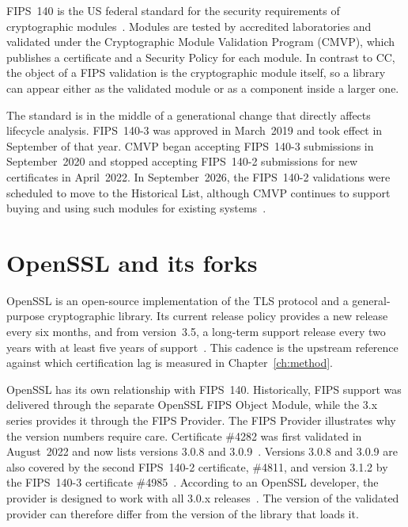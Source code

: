 FIPS~140 is the US federal standard for the security requirements of
cryptographic modules~\cite{fips1402,fips1403}. Modules are tested by
accredited laboratories and validated under the Cryptographic Module
Validation Program (CMVP), which publishes a certificate and a Security
Policy for each module. In contrast to CC, the object of a FIPS validation
is the cryptographic module itself, so a library can appear either as the
validated module or as a component inside a larger one.

The standard is in the middle of a generational change that directly affects
lifecycle analysis. FIPS~140-3 was approved in March~2019 and took effect in
September of that year. CMVP began accepting FIPS~140-3 submissions in
September~2020 and stopped accepting FIPS~140-2 submissions for new
certificates in April~2022. In September~2026, the FIPS~140-2 validations were
scheduled to move to the Historical List, although CMVP continues to support
buying and using such modules for existing systems~\cite{nistTransition}.


\section{OpenSSL and its forks}
\label{sec:libraries}

OpenSSL is an open-source implementation of the TLS protocol and a
general-purpose cryptographic library. Its current release policy provides a
new release every six months, and from version~3.5, a long-term support
release every two years with at least five years of
support~\cite{opensslReleaseStrategy}. This cadence is the upstream reference
against which certification lag is measured in Chapter~\ref{ch:method}.

OpenSSL has its own relationship with FIPS~140. Historically, FIPS support was
delivered through the separate OpenSSL FIPS Object Module, while the 3.x series
provides it through the FIPS Provider. The FIPS Provider illustrates why the
version numbers require care. Certificate \#4282 was first validated in
August~2022 and now lists versions 3.0.8 and 3.0.9~\cite{cmvp4282}. Versions
3.0.8 and 3.0.9 are also covered by the second FIPS~140-2 certificate, \#4811,
and version 3.1.2 by the FIPS~140-3 certificate \#4985~\cite{opensslFipsCve}.
According to an OpenSSL developer, the provider is designed to work with all
3.0.x releases~\cite{opensslUsers4282}. The version of the validated provider
can therefore differ from the version of the library that loads it.


